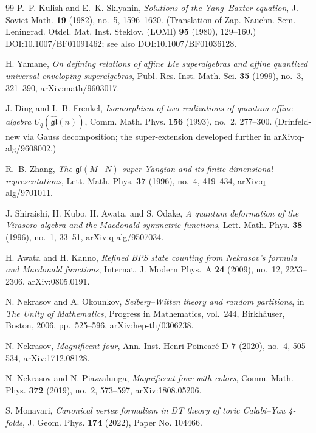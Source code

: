 \begin{thebibliography}{99}
P.~P. Kulish and E.~K. Sklyanin, \emph{Solutions of the Yang--Baxter equation}, J. Soviet Math. \textbf{19} (1982), no.~5, 1596--1620. (Translation of Zap. Nauchn. Sem. Leningrad. Otdel. Mat. Inst. Steklov. (LOMI) \textbf{95} (1980), 129--160.) DOI:10.1007/BF01091462; see also DOI:10.1007/BF01036128.

H. Yamane, \emph{On defining relations of affine Lie superalgebras and affine quantized universal enveloping superalgebras}, Publ. Res. Inst. Math. Sci. \textbf{35} (1999), no.~3, 321--390, arXiv:math/9603017.

J. Ding and I.~B. Frenkel, \emph{Isomorphism of two realizations of quantum affine algebra $U_q(\widehat{\mathfrak{gl}}(n))$}, Comm. Math. Phys. \textbf{156} (1993), no.~2, 277--300. (Drinfeld-new via Gauss decomposition; the super-extension developed further in arXiv:q-alg/9608002.)

R.~B. Zhang, \emph{The $\mathfrak{gl}(M \mid N)$ super Yangian and its finite-dimensional representations}, Lett. Math. Phys. \textbf{37} (1996), no.~4, 419--434, arXiv:q-alg/9701011.

J. Shiraishi, H. Kubo, H. Awata, and S. Odake, \emph{A quantum deformation of the Virasoro algebra and the Macdonald symmetric functions}, Lett. Math. Phys. \textbf{38} (1996), no.~1, 33--51, arXiv:q-alg/9507034.

H. Awata and H. Kanno, \emph{Refined BPS state counting from Nekrasov's formula and Macdonald functions}, Internat. J. Modern Phys.~A \textbf{24} (2009), no.~12, 2253--2306, arXiv:0805.0191.

N. Nekrasov and A. Okounkov, \emph{Seiberg--Witten theory and random partitions}, in \emph{The Unity of Mathematics}, Progress in Mathematics, vol.~244, Birkh\"auser, Boston, 2006, pp.~525--596, arXiv:hep-th/0306238.

N. Nekrasov, \emph{Magnificent four}, Ann. Inst. Henri Poincar\'e D \textbf{7} (2020), no.~4, 505--534, arXiv:1712.08128.

N. Nekrasov and N. Piazzalunga, \emph{Magnificent four with colors}, Comm. Math. Phys. \textbf{372} (2019), no.~2, 573--597, arXiv:1808.05206.

S. Monavari, \emph{Canonical vertex formalism in DT theory of toric Calabi--Yau 4-folds}, J. Geom. Phys. \textbf{174} (2022), Paper No. 104466.


\end{thebibliography}
